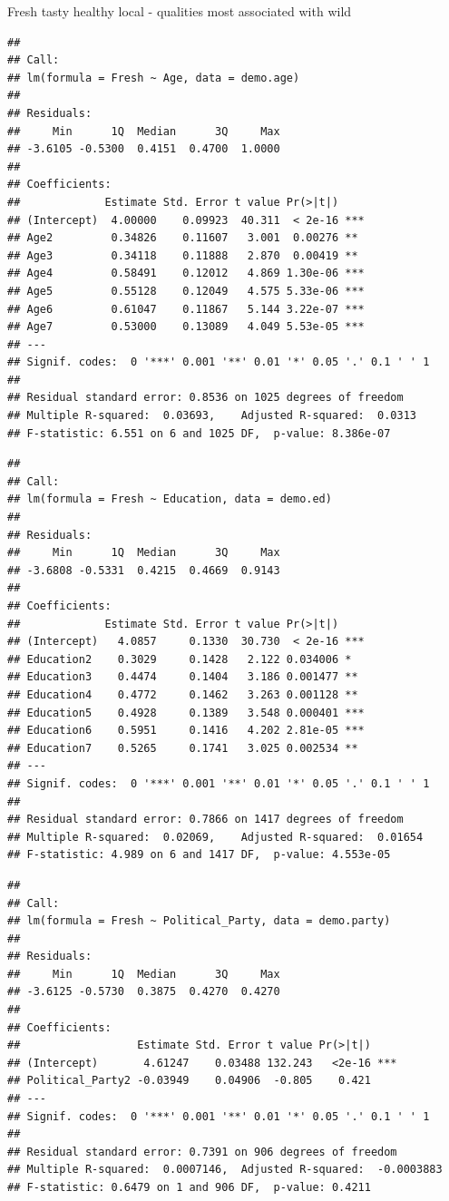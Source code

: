 \documentclass[
  12pt,
]{article}
\begin{document}
Fresh tasty healthy local - qualities most associated with wild

\begin{verbatim}
## 
## Call:
## lm(formula = Fresh ~ Age, data = demo.age)
## 
## Residuals:
##     Min      1Q  Median      3Q     Max 
## -3.6105 -0.5300  0.4151  0.4700  1.0000 
## 
## Coefficients:
##             Estimate Std. Error t value Pr(>|t|)    
## (Intercept)  4.00000    0.09923  40.311  < 2e-16 ***
## Age2         0.34826    0.11607   3.001  0.00276 ** 
## Age3         0.34118    0.11888   2.870  0.00419 ** 
## Age4         0.58491    0.12012   4.869 1.30e-06 ***
## Age5         0.55128    0.12049   4.575 5.33e-06 ***
## Age6         0.61047    0.11867   5.144 3.22e-07 ***
## Age7         0.53000    0.13089   4.049 5.53e-05 ***
## ---
## Signif. codes:  0 '***' 0.001 '**' 0.01 '*' 0.05 '.' 0.1 ' ' 1
## 
## Residual standard error: 0.8536 on 1025 degrees of freedom
## Multiple R-squared:  0.03693,    Adjusted R-squared:  0.0313 
## F-statistic: 6.551 on 6 and 1025 DF,  p-value: 8.386e-07
\end{verbatim}

\begin{verbatim}
## 
## Call:
## lm(formula = Fresh ~ Education, data = demo.ed)
## 
## Residuals:
##     Min      1Q  Median      3Q     Max 
## -3.6808 -0.5331  0.4215  0.4669  0.9143 
## 
## Coefficients:
##             Estimate Std. Error t value Pr(>|t|)    
## (Intercept)   4.0857     0.1330  30.730  < 2e-16 ***
## Education2    0.3029     0.1428   2.122 0.034006 *  
## Education3    0.4474     0.1404   3.186 0.001477 ** 
## Education4    0.4772     0.1462   3.263 0.001128 ** 
## Education5    0.4928     0.1389   3.548 0.000401 ***
## Education6    0.5951     0.1416   4.202 2.81e-05 ***
## Education7    0.5265     0.1741   3.025 0.002534 ** 
## ---
## Signif. codes:  0 '***' 0.001 '**' 0.01 '*' 0.05 '.' 0.1 ' ' 1
## 
## Residual standard error: 0.7866 on 1417 degrees of freedom
## Multiple R-squared:  0.02069,    Adjusted R-squared:  0.01654 
## F-statistic: 4.989 on 6 and 1417 DF,  p-value: 4.553e-05
\end{verbatim}

\begin{verbatim}
## 
## Call:
## lm(formula = Fresh ~ Political_Party, data = demo.party)
## 
## Residuals:
##     Min      1Q  Median      3Q     Max 
## -3.6125 -0.5730  0.3875  0.4270  0.4270 
## 
## Coefficients:
##                  Estimate Std. Error t value Pr(>|t|)    
## (Intercept)       4.61247    0.03488 132.243   <2e-16 ***
## Political_Party2 -0.03949    0.04906  -0.805    0.421    
## ---
## Signif. codes:  0 '***' 0.001 '**' 0.01 '*' 0.05 '.' 0.1 ' ' 1
## 
## Residual standard error: 0.7391 on 906 degrees of freedom
## Multiple R-squared:  0.0007146,  Adjusted R-squared:  -0.0003883 
## F-statistic: 0.6479 on 1 and 906 DF,  p-value: 0.4211
\end{verbatim}
\end{document}
